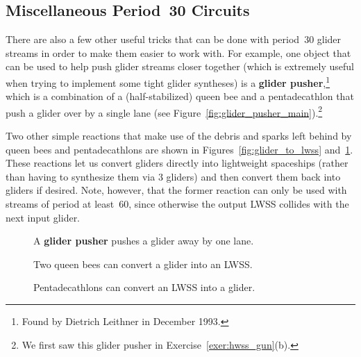 \subsection{Miscellaneous Period~30 Circuits}\label{sec:p30_misc_circuits}

There are also a few other useful tricks that can be done with period~$30$ glider streams in order to make them easier to work with. For example, one object that can be used to help push glider streams closer together (which is extremely useful when trying to implement some tight glider syntheses) is a \textbf{glider pusher},\footnote{Found by Dietrich Leithner in December 1993.} which is a combination of a (half-stabilized) queen bee and a pentadecathlon that push a glider over by a single lane (see Figure~\ref{fig:glider_pusher_main}).\footnote{We first saw this glider pusher in Exercise~\ref{exer:hwss_gun}(b).}

Two other simple reactions that make use of the debris and sparks left behind by queen bees and pentadecathlons are shown in Figures~\ref{fig:glider_to_lwss} and~\ref{fig:lwss_to_glider}. These reactions let us convert gliders directly into lightweight spaceships (rather than having to synthesize them via $3$ gliders) and then convert them back into gliders if desired. Note, however, that the former reaction can only be used with streams of period at least~$60$, since otherwise the output LWSS collides with the next input glider.

\begin{figure}
	\centering
	\begin{minipage}{0.27\textwidth}
		\centering
		\caption{A \textbf{glider pusher} pushes a glider away by one lane.}\label{fig:glider_pusher_main}
	\end{minipage}\quad
	\begin{minipage}{0.4\textwidth}
		\centering\vspace*{-0.1cm}
		\caption{Two queen bees can convert a glider into an LWSS.}\label{fig:glider_to_lwss}
	\end{minipage}\quad
	\begin{minipage}{0.27\textwidth}
		\centering\vspace*{0.05cm}
		\caption{Pentadecathlons can convert an LWSS into a glider.}\label{fig:lwss_to_glider}
	\end{minipage}
\end{figure}

